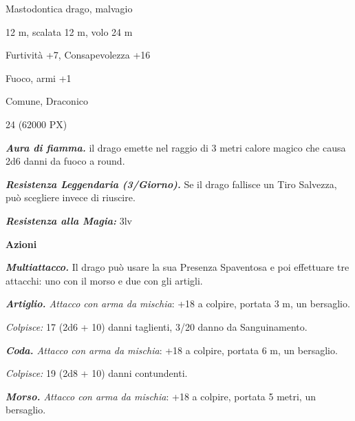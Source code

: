 \begin{multicols}{2}
{
\begin{description}[noitemsep, topsep=0pt, parsep=0pt, partopsep=0pt, itemsep=1pt, leftmargin=2.35cm,  labelwidth=2.2cm, itemindent=0cm, listparindent=0pt] %
\setlength{\baselineskip}{10pt}
\item[\textbf{Taglia/Tipo}] Mastodontica drago, malvagio
\item[\textbf{Caratt.}] 
\item[\textbf{Punti Ferita}] 
\item[\textbf{Movimento}] 12 m, scalata 12 m, volo 24 m
\item[\textbf{Tiri Salvez.}] 
\item[\textbf{Comp.}] Furtività +7, Consapevolezza +16
\item[\textbf{Imm. Danni}] Fuoco, armi +1
\item[\textbf{Sensi}] 
\item[\textbf{Linguaggi}] Comune, Draconico
\item[\textbf{Sfida}] 24 (62000 PX)
\end{description}
\smallskip

\emph{\textbf{Aura di fiamma.}} il drago emette nel raggio di 3 metri calore magico che causa 2d6 danni da fuoco a round.

\emph{\textbf{Resistenza Leggendaria (3/Giorno).}} Se il drago fallisce un Tiro Salvezza, può scegliere invece di riuscire.

\emph{\textbf{Resistenza alla Magia:}} 3lv

\textbf{Azioni}

\emph{\textbf{Multiattacco.}} Il drago può usare la sua Presenza Spaventosa e poi effettuare tre attacchi: uno con il morso e due con gli artigli.

\emph{\textbf{Artiglio.} Attacco con arma da mischia}: +18 a colpire, portata 3 m, un bersaglio.

\emph{Colpisce:} 17 (2d6 + 10) danni taglienti, 3/20 danno da Sanguinamento.

\emph{\textbf{Coda.} Attacco con arma da mischia}: +18 a colpire, portata 6 m, un bersaglio.

\emph{Colpisce:} 19 (2d8 + 10) danni contundenti.

\emph{\textbf{Morso.} Attacco con arma da mischia}: +18 a colpire, portata 5 metri, un bersaglio.

}
\end{multicols}
